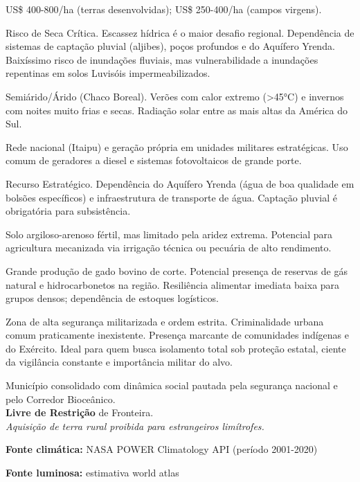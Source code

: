 \begin{description}[style=nextline,leftmargin=0.5cm,font=\bfseries]
\item[Preço da Terra]  US\$ 400-800/\allowbreak ha (terras desenvolvidas); US\$ 250-400/\allowbreak ha (campos virgens).
\item[Hidrologia]  Risco de Seca Crítica. Escassez hídrica é o maior desafio regional. Dependência de sistemas de captação pluvial (aljibes), poços profundos e do Aquífero Yrenda. Baixíssimo risco de inundações fluviais, mas vulnerabilidade a inundações repentinas em solos Luvisóis impermeabilizados.
\item[Clima]  Semiárido/\allowbreak Árido (Chaco Boreal). Verões com calor extremo (>45°C) e invernos com noites muito frias e secas. Radiação solar entre as mais altas da América do Sul.
\item[Energia]  Rede nacional (Itaipu) e geração própria em unidades militares estratégicas. Uso comum de geradores a diesel e sistemas fotovoltaicos de grande porte.
\item[Água]  Recurso Estratégico. Dependência do Aquífero Yrenda (água de boa qualidade em bolsões específicos) e infraestrutura de transporte de água. Captação pluvial é obrigatória para subsistência.
\item[Qualidade do Solo]  Solo argiloso-arenoso fértil, mas limitado pela aridez extrema. Potencial para agricultura mecanizada via irrigação técnica ou pecuária de alto rendimento.
\item[Recursos Locais]  Grande produção de gado bovino de corte. Potencial presença de reservas de gás natural e hidrocarbonetos na região. Resiliência alimentar imediata baixa para grupos densos; dependência de estoques logísticos.
\item[Segurança]  Zona de alta segurança militarizada e ordem estrita. Criminalidade urbana comum praticamente inexistente. Presença marcante de comunidades indígenas e do Exército. Ideal para quem busca isolamento total sob proteção estatal, ciente da vigilância constante e importância militar do alvo.
\item[Leis Local]  Município consolidado com dinâmica social pautada pela segurança nacional e pelo Corredor Bioceânico. \\ \textbf{Livre de Restrição} de Fronteira. \\ \textit{Aquisição de terra rural proibida para estrangeiros limítrofes.}
\end{description}
\textbf{Fonte climática:} NASA POWER Climatology API (período 2001-2020)

\textbf{Fonte luminosa:} estimativa world atlas

